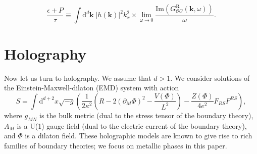 \documentclass[10pt, oneside]{book}
\begin{document}
\begin{doublespace}
\begin{equation}
\frac{\epsilon+P}{\tau} \equiv \int \mathrm{d}^d\mathbf{k} \; |h(\mathbf{k})|^2 k_x^2 \times \lim_{\omega\rightarrow 0} \frac{\mathrm{Im}\left( G^{\mathrm{R}}_{\mathcal{O}\mathcal{O}}(\mathbf{k},\omega)\right)}{\omega}.  \label{taudef} 
\end{equation}  

\section{Holography} \label{sec4}
Now let us turn to holography.   We assume that $d>1$.  We consider solutions of the Einstein-Maxwell-dilaton (EMD) system with action \begin{equation}
S = \int \mathrm{d}^{d+2}x \sqrt{-g}\left(\frac{1}{2\kappa^2}\left(R-2(\partial_M\Phi)^2 - \frac{V(\Phi)}{L^2}\right) - \frac{Z(\Phi)}{4e^2}F_{RS}F^{RS} \right),
\end{equation}where $g_{MN}$ is the bulk metric (dual to the stress tensor of the boundary theory), $A_M$ is a U(1) gauge field (dual to the electric current of the boundary theory), and $\Phi$ is a dilaton field.     These holographic models are known to give rise to rich families of boundary theories; we focus on metallic phases in this paper.


\end{doublespace}
\end{document}
